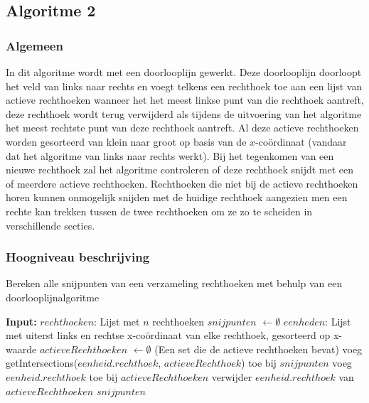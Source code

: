 \documentclass{article}
\begin{document}
\newpage
\subsection{Algoritme 2}
\subsubsection{Algemeen}
\label{algo2_1}
In dit algoritme wordt met een doorlooplijn gewerkt. Deze doorlooplijn doorloopt het veld van links naar rechts en voegt telkens een rechthoek toe aan een lijst van actieve rechthoeken wanneer het het meest linkse punt van die rechthoek aantreft, deze rechthoek wordt terug verwijderd als tijdens de uitvoering van het algoritme het meest rechtste punt van deze rechthoek aantreft. Al deze actieve rechthoeken worden gesorteerd van klein naar groot op basis van de $x$-co\"ordinaat (vandaar dat het algoritme van links naar rechts werkt).
Bij het tegenkomen van een nieuwe rechthoek zal het algoritme controleren of deze rechthoek snijdt met een of meerdere actieve rechthoeken. Rechthoeken die niet bij de actieve rechthoeken horen kunnen onmogelijk snijden met de huidige rechthoek aangezien men een rechte kan trekken tussen de twee rechthoeken om ze zo te scheiden in verschillende secties.


\subsubsection{Hoogniveau beschrijving}
\label{algo2_2}
\begin{algorithm}
\caption{Bereken alle snijpunten van een verzameling rechthoeken met behulp van een doorlooplijnalgoritme}
\begin{algorithmic}
	\STATE \textbf{Input:}  $rechthoeken$: Lijst met $n$ rechthoeken
	\STATE $snijpunten$ $\gets \emptyset$
	\STATE $eenheden$: Lijst met uiterst links en rechtse x-co\"ordinaat van elke rechthoek, gesorteerd op x-waarde
	\STATE $actieveRechthoeken$ $\gets \emptyset$ (Een set die de actieve rechthoeken bevat)
                 \STATE  voeg getIntersections($eenheid.rechthoek$, $actieveRechthoek$) toe bij $snijpunten$
            \ENDFOR
            \STATE voeg $eenheid.rechthoek$ toe bij $actieveRechthoeken$
        \ELSE
        \STATE verwijder $eenheid.rechthoek$ van $actieveRechthoeken$
        \ENDIF
    \ENDFOR
    \RETURN $snijpunten$
\end{algorithmic}
\end{algorithm}
\end{document}
